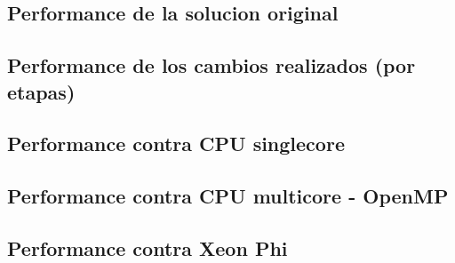 \subsection{Performance de la solucion original}
\subsection{Performance de los cambios realizados (por etapas)}


\subsection{Performance contra CPU singlecore}
\subsection{Performance contra CPU multicore - OpenMP}
\subsection{Performance contra Xeon Phi}
